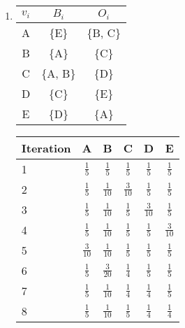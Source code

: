 \documentclass[ngerman]{scrartcl}
\begin{document}
\begin{enumerate}[label=\alph*)]
\begin{enumerate}[label=\Roman*)]
      \item
      \begin{tabular}{|*{3}{c|}}
        \hline
        $v_i$ & $B_i$ & $O_i$    \\
        \hline
        A & \{E\}     & \{B, C\} \\
        \hline
        B & \{A\}     & \{C\}    \\
        \hline
        C & \{A, B\}  & \{D\}    \\
        \hline
        D & \{C\}     & \{E\}    \\
        \hline
        E & \{D\}     & \{A\}    \\
        \hline
      \end{tabular}
      \begin{doublespacing}
        \begin{tabular}{|l|*{5}{c|}}
          \hline
          Iteration & A & B & C & D & E \\
          \hline
          1 & $\frac{1}{5}$ & $\frac{1}{5}$ & $\frac{1}{5}$ & $\frac{1}{5}$ & $\frac{1}{5}$ \\
          \hline
          2 & $\frac{1}{5}$ & $\frac{1}{10}$ & $\frac{3}{10}$ & $\frac{1}{5}$ & $\frac{1}{5}$ \\
          \hline
          3 & $\frac{1}{5}$ & $\frac{1}{10}$ & $\frac{1}{5}$ & $\frac{3}{10}$ & $\frac{1}{5}$ \\
          \hline
          4 & $\frac{1}{5}$ & $\frac{1}{10}$ & $\frac{1}{5}$ & $\frac{1}{5}$ & $\frac{3}{10}$ \\
          \hline
          5 & $\frac{3}{10}$ & $\frac{1}{10}$ & $\frac{1}{5}$ & $\frac{1}{5}$ & $\frac{1}{5}$ \\
          \hline
          6 & $\frac{1}{5}$ & $\frac{3}{20}$ & $\frac{1}{4}$ & $\frac{1}{5}$ & $\frac{1}{5}$ \\
          \hline
          7 & $\frac{1}{5}$ & $\frac{1}{10}$ & $\frac{1}{4}$ & $\frac{1}{4}$ & $\frac{1}{5}$ \\
          \hline
          8 & $\frac{1}{5}$ & $\frac{1}{10}$ & $\frac{1}{5}$ & $\frac{1}{4}$ & $\frac{1}{4}$ \\
          \hline
        \end{tabular}
      \end{doublespacing}
    \end{enumerate}
  \end{enumerate}
\end{document}
